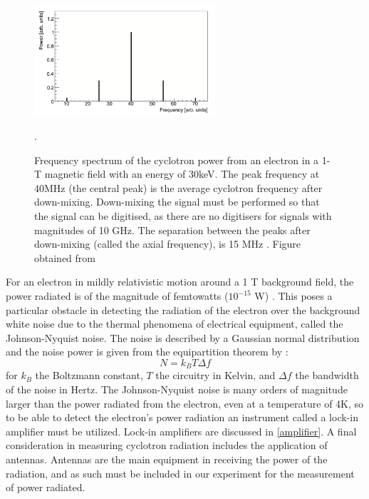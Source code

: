 \documentclass[a4paper,12pt, notitlepage]{article}
\begin{document}
\begin{figure}[b!]
\centering
\includegraphics[width=0.6\textwidth]{pictures/powerSpectrum.png}
\vspace{-2mm}
\caption{Frequency spectrum of the cyclotron power from an electron in a 1-T magnetic field with an energy of 30keV. The peak frequency at 40MHz (the central peak) is the average cyclotron frequency after down-mixing.  Down-mixing the signal must be performed so that the signal can be digitised, as there are no digitisers for signals with magnitudes of 10 GHz. The separation between the peaks after down-mixing (called the axial frequency), is 15 MHz . Figure obtained from \cite{Ashtari2019}}.
\label{fig:fig04}
\end{figure}
For an electron in mildly relativistic motion around a 1 T background field, the power radiated is of the magnitude of femtowatts ($10^{-15}$ W) \cite{Ashtari2019}. This poses a particular obstacle in detecting the radiation of the electron over the background white noise due to the thermal phenomena of electrical equipment, called the Johnson-Nyquist noise. 
The noise is described by a Gaussian normal distribution and the noise power is given from the equipartition theorem \cite{Nyquist1928} by \cite{Kittel1980, reif1965}:
\begin{equation}
    N = k_{B}T\Delta f
\end{equation}
for $k_{B}$ the Boltzmann constant, $T$ the circuitry in Kelvin, and $\Delta f$ the bandwidth of the noise in Hertz. The Johnson-Nyquist noise is many orders of magnitude larger than the power radiated from the electron, even at a temperature of 4K, so to be able to detect the electron's power radiation an instrument called a lock-in amplifier must be utilized. Lock-in amplifiers are discussed in \cref{amplifier}.
A final consideration in measuring cyclotron radiation includes the application of antennas. Antennas are the main equipment in receiving the power of the radiation, and as such must be included in our experiment for the measurement of power radiated.
\end{document}
